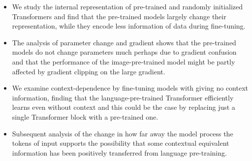 \begin{itemize}
    \item We study the internal representation of pre-trained and randomly initialized Transformers and find that the pre-trained models largely change their representation, while they encode less information of data during fine-tuning.
    \item The analysis of parameter change and gradient shows that the pre-trained models do not change parameters much perhaps due to gradient confusion and that the performance of the image-pre-trained model might be partly affected by gradient clipping on the large gradient.
    \item We examine context-dependence by fine-tuning models with giving no context information, finding that the language-pre-trained Transformer efficiently learns even without context and this could be the case by replacing just a single Transformer block with a pre-trained one.
    \item Subsequent analysis of the change in how far away the model process the tokens of input supports the possibility that some contextual equivalent information has been positively transferred from language pre-training.
\end{itemize}